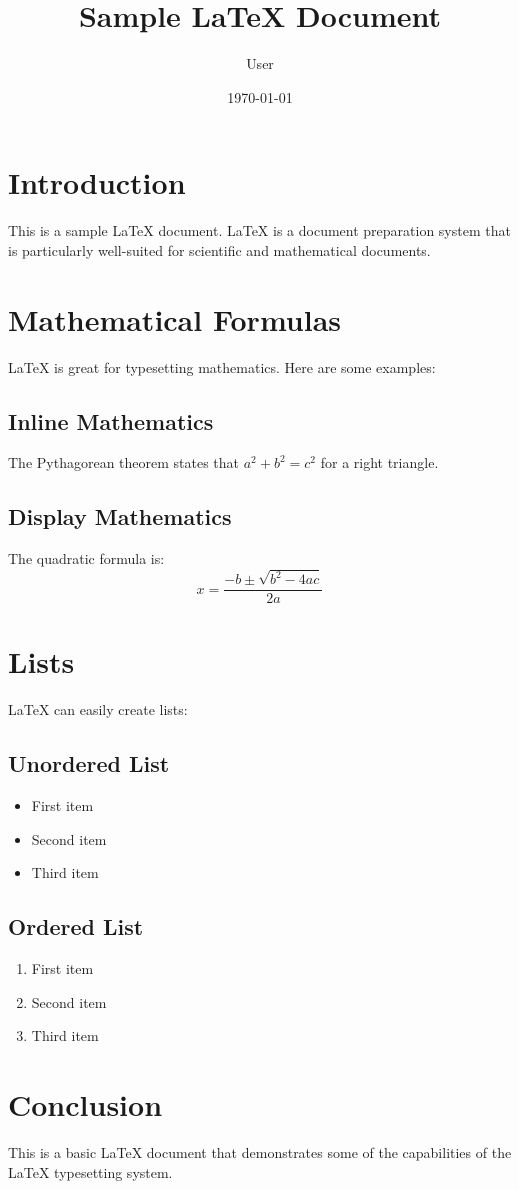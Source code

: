 \documentclass[12pt,a4paper]{article}
\title{Sample \LaTeX{} Document}
\author{User}
\date{\today}
\begin{document}
\maketitle

\section{Introduction}
This is a sample \LaTeX{} document. \LaTeX{} is a document preparation system that is particularly well-suited for scientific and mathematical documents.

\section{Mathematical Formulas}
\LaTeX{} is great for typesetting mathematics. Here are some examples:

\subsection{Inline Mathematics}
The Pythagorean theorem states that $a^2 + b^2 = c^2$ for a right triangle.

\subsection{Display Mathematics}
The quadratic formula is:
\begin{equation}
x = \frac{-b \pm \sqrt{b^2 - 4ac}}{2a}
\end{equation}

\section{Lists}
\LaTeX{} can easily create lists:

\subsection{Unordered List}
\begin{itemize}
  \item First item
  \item Second item
  \item Third item
\end{itemize}

\subsection{Ordered List}
\begin{enumerate}
  \item First item
  \item Second item
  \item Third item
\end{enumerate}

\section{Conclusion}
This is a basic \LaTeX{} document that demonstrates some of the capabilities of the \LaTeX{} typesetting system.
\end{document}
